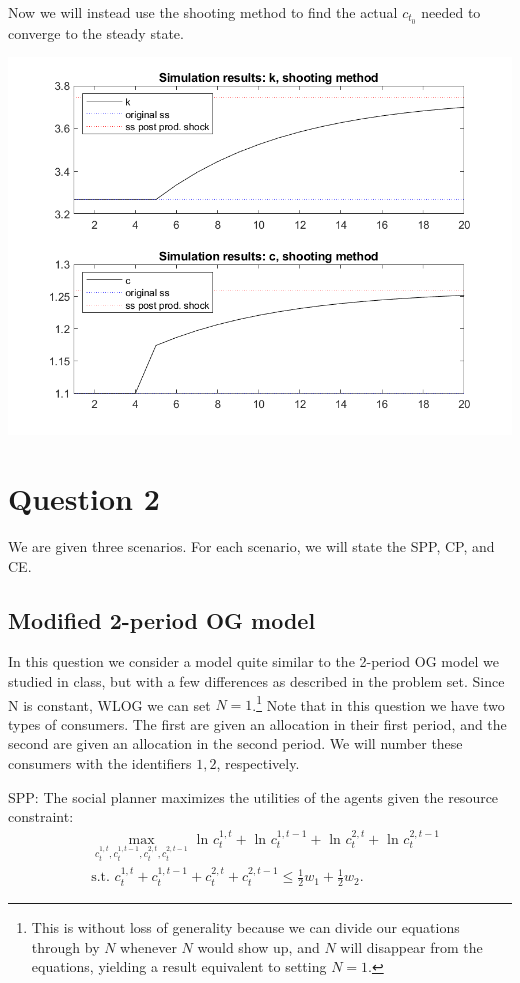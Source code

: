 \documentclass[11pt]{article} %
\begin{document}
Now we will instead use the shooting method to find the actual $c_{t_0}$ needed to converge to the steady state.

\includegraphics{sh}

\section{Question 2}

We are given three scenarios. For each scenario, we will state the SPP, CP, and CE.

\subsection{Modified 2-period OG model}
In this question we consider a model quite similar to the 2-period OG model we studied in class, but with a few differences as described in the problem set. Since N is constant, WLOG we can set $N=1$.\footnote{This is without loss of generality because we can divide our equations through by $N$ whenever $N$ would show up, and $N$ will disappear from the equations, yielding a result equivalent to setting $N=1$.} Note that in this question we have two types of consumers. The first are given an allocation in their first period, and the second are given an allocation in the second period. We will number these consumers with the identifiers $1,2$, respectively.

SPP: The social planner maximizes the utilities of the agents given the resource constraint:
\begin{align*} 
&\max_{c_t^{1,t},c_{t}^{1,t-1},c_t^{2,t},c_{t}^{2,t-1}} \text{ ln } c_{t}^{1,t} + \text{ ln } c_{t}^{1,t-1} + \text{ ln } c_{t}^{2,t} + \text{ ln } c_{t}^{2,t-1}\\
&\text{s.t. }  c_{t}^{1,t} +  c_{t}^{1,t-1} + c_{t}^{2,t} +  c_{t}^{2,t-1} \leq \frac{1}{2}w_1 + \frac{1}{2} w_2.
\end{align*}
\end{document}
